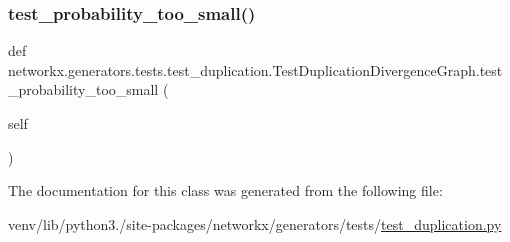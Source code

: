 \subsubsection{\texorpdfstring{test\+\_\+probability\+\_\+too\+\_\+small()}{test\_probability\_too\_small()}}
{\footnotesize\ttfamily def networkx.\+generators.\+tests.\+test\+\_\+duplication.\+Test\+Duplication\+Divergence\+Graph.\+test\+\_\+probability\+\_\+too\+\_\+small (\begin{DoxyParamCaption}\item[{}]{self }\end{DoxyParamCaption})}



The documentation for this class was generated from the following file\+:\begin{DoxyCompactItemize}
\item 
venv/lib/python3./site-\/packages/networkx/generators/tests/\hyperlink{test__duplication_8py}{test\+\_\+duplication.\+py}\end{DoxyCompactItemize}
